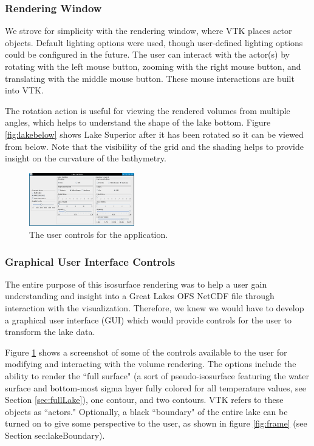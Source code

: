 \documentclass{article} %
\begin{document}
\subsubsection{Rendering Window}

We strove for simplicity with the rendering window, where VTK places actor objects.  Default lighting options were used, though user-defined lighting options could be configured in the future.  The user can interact with the actor(s) by rotating with the left mouse button, zooming with the right mouse button, and translating with the middle mouse button.  These mouse interactions are built into VTK.

The rotation action is useful for viewing the rendered volumes from multiple angles, which helps to understand the shape of the lake bottom.  Figure \ref{fig:lakebelow} shows Lake Superior after it has been rotated so it can be viewed from below.  Note that the visibility of the grid and the shading helps to provide insight on the curvature of the bathymetry.


\begin{figure}
   \centering
   \includegraphics[width=1.8in]{figures/lakecontrols.eps}
    \caption{The user controls for the application.}
   \label{fig:controls}
\end{figure}


\subsubsection{Graphical User Interface Controls}\label{sec:gui}

The entire purpose of this isosurface rendering was to help a user gain understanding and insight into a Great Lakes OFS NetCDF file through interaction with the visualization.  Therefore, we knew we would have to develop a graphical user interface (GUI) which would provide controls for the user to transform the lake data.

Figure \ref{fig:controls} shows a screenshot of some of the controls available to the user for modifying and interacting with the volume rendering.  The options include the ability to render the ``full surface" (a sort of pseudo-isosurface featuring the water surface and bottom-most sigma layer fully colored for all temperature values, see Section \ref{sec:fullLake}), one contour, and two contours.  VTK refers to these objects as ``actors."  Optionally, a black ``boundary" of the entire lake can be turned on to give some perspective to the user, as shown in figure \ref{fig:frame} (see Section {sec:lakeBoundary}).
\end{document}
